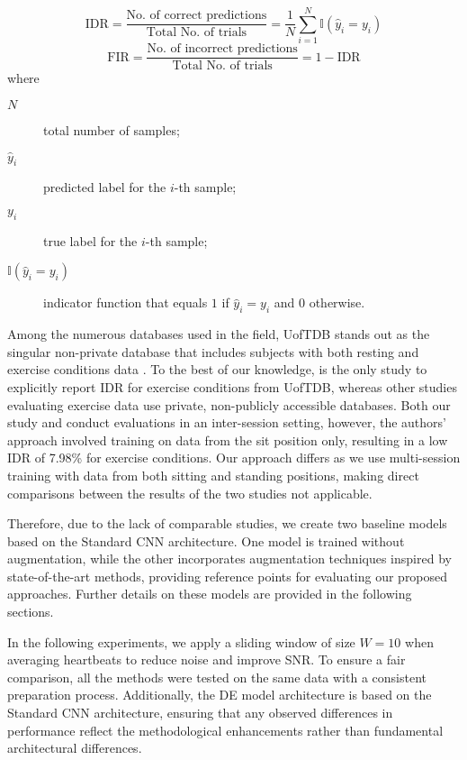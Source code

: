 \begin{equation}
    \text{IDR} = \frac{\text{No. of correct predictions}}{\text{Total No. of trials}} = \frac{1}{N} \sum_{i=1}^{N} \mathbb{I}(\hat{y}_i = y_i)
    \label{eq:ir}
\end{equation}
\begin{equation}
    \text{FIR} = \frac{\text{No. of incorrect predictions}}{\text{Total No. of trials}} = 1-\text{IDR}
    \label{eq:fir}
\end{equation}
where
\begin{description}
    \item[$N$] \qquad\enspace total number of samples;
    \item[$\hat{y}_i$] \qquad\enspace predicted label for the $i$-th sample;
    \item[$y_i$] \qquad\enspace true label for the $i$-th sample;
    \item[$\mathbb{I}(\hat{y}_i=y_i)$] \qquad\enspace indicator function that equals $1$ if $\hat{y}_i = y_i$ and \text{\qquad\enspace}$0$ otherwise.
\end{description}
Among the numerous databases used in the field, UofTDB stands out as the singular non-private database that includes subjects with both resting and exercise conditions data \cite{8392675, Wahabi2014}.
To the best of our knowledge, \cite{Jyotishi2022} is the only study to explicitly report IDR for exercise conditions from UofTDB, whereas other studies evaluating exercise data use private, non-publicly accessible databases.
Both our study and \cite{Jyotishi2022} conduct evaluations in an inter-session setting, however, the authors' approach involved training on data from the sit position only, resulting in a low IDR of 7.98\% for exercise conditions.
Our approach differs as we use multi-session training with data from both sitting and standing positions, making direct comparisons between the results of the two studies not applicable.

Therefore, due to the lack of comparable studies, we create two baseline models based on the Standard CNN architecture. One model is trained without augmentation, while the other incorporates augmentation techniques inspired by state-of-the-art methods, providing reference points for evaluating our proposed approaches. Further details on these models are provided in the following sections.

In the following experiments, we apply a sliding window of size $W=10$ when averaging heartbeats to reduce noise and improve SNR.
To ensure a fair comparison, all the methods were tested on the same data with a consistent preparation process. Additionally, the DE model architecture is based on the Standard CNN architecture, ensuring that any observed differences in performance reflect the methodological enhancements rather than fundamental architectural differences.

